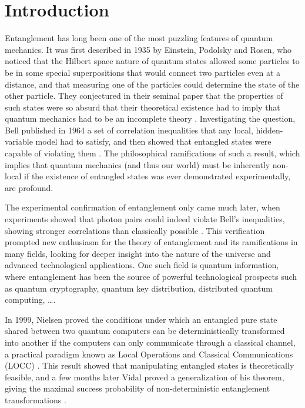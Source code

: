 \chapter*{Introduction}

Entanglement has long been one of the most puzzling features of quantum mechanics. It was first described in 1935 by Einstein, Podolsky and Rosen, who noticed that the Hilbert space nature of quantum states allowed some particles to be in some special superpositions that would connect two particles even at a distance, and that measuring one of the particles could determine the state of the other particle. They conjectured in their seminal paper that the properties of such states were so absurd that their theoretical existence had to imply that quantum mechanics had to be an incomplete theory \cite{einstein_can_1935}. Investigating the question, Bell published in 1964 a set of correlation inequalities that any local, hidden-variable model had to satisfy, and then showed that entangled states were capable of violating them \cite{bell_einstein_1964}. The philosophical ramifications of such a result, which implies that quantum mechanics (and thus our world) must be inherently non-local if the existence of entangled states was ever demonstrated experimentally, are profound.

The experimental confirmation of entanglement only came much later, when experiments showed that photon pairs could indeed violate Bell's inequalities, showing stronger correlations than classically possible \cite{aspect_experimental_1982}. This verification prompted new enthusiasm for the theory of entanglement and its ramifications in many fields, looking for deeper insight into the nature of the universe and advanced technological applications. One such field is quantum information, where entanglement has been the source of powerful technological prospects such as quantum cryptography, quantum key distribution, distributed quantum computing, \dots \cite{horodecki_quantum_2009}.

In 1999, Nielsen proved the conditions under which an entangled pure state shared between two quantum computers can be deterministically transformed into another if the computers can only communicate through a classical channel, a practical paradigm known as Local Operations and Classical Communications (LOCC) \cite{nielsen_conditions_1999}. This result showed that manipulating entangled states is theoretically feasible, and a few months later Vidal proved a generalization of his theorem, giving the maximal success probability of non-deterministic entanglement transformations \cite{vidal_entanglement_1999}. 

